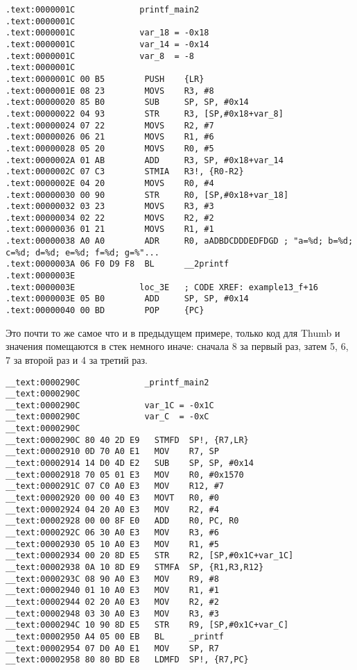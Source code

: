 \begin{lstlisting}[style=customasmARM]
.text:0000001C             printf_main2
.text:0000001C
.text:0000001C             var_18 = -0x18
.text:0000001C             var_14 = -0x14
.text:0000001C             var_8  = -8
.text:0000001C
.text:0000001C 00 B5        PUSH    {LR}
.text:0000001E 08 23        MOVS    R3, #8
.text:00000020 85 B0        SUB     SP, SP, #0x14
.text:00000022 04 93        STR     R3, [SP,#0x18+var_8]
.text:00000024 07 22        MOVS    R2, #7
.text:00000026 06 21        MOVS    R1, #6
.text:00000028 05 20        MOVS    R0, #5
.text:0000002A 01 AB        ADD     R3, SP, #0x18+var_14
.text:0000002C 07 C3        STMIA   R3!, {R0-R2}
.text:0000002E 04 20        MOVS    R0, #4
.text:00000030 00 90        STR     R0, [SP,#0x18+var_18]
.text:00000032 03 23        MOVS    R3, #3
.text:00000034 02 22        MOVS    R2, #2
.text:00000036 01 21        MOVS    R1, #1
.text:00000038 A0 A0        ADR     R0, aADBDCDDDEDFDGD ; "a=%d; b=%d; c=%d; d=%d; e=%d; f=%d; g=%"...
.text:0000003A 06 F0 D9 F8  BL      __2printf
.text:0000003E
.text:0000003E             loc_3E   ; CODE XREF: example13_f+16
.text:0000003E 05 B0        ADD     SP, SP, #0x14
.text:00000040 00 BD        POP     {PC}
\end{lstlisting}

Это почти то же самое что и в предыдущем примере, только код для Thumb и значения помещаются в 
стек немного иначе: сначала 8 за первый раз, затем 5, 6, 7 за второй раз и 4 за третий раз.

\myparagraph{\OptimizingXcodeIV: \ARMMode}

\begin{lstlisting}[style=customasmARM]
__text:0000290C             _printf_main2
__text:0000290C
__text:0000290C             var_1C = -0x1C
__text:0000290C             var_C  = -0xC
__text:0000290C
__text:0000290C 80 40 2D E9   STMFD  SP!, {R7,LR}
__text:00002910 0D 70 A0 E1   MOV    R7, SP
__text:00002914 14 D0 4D E2   SUB    SP, SP, #0x14
__text:00002918 70 05 01 E3   MOV    R0, #0x1570
__text:0000291C 07 C0 A0 E3   MOV    R12, #7
__text:00002920 00 00 40 E3   MOVT   R0, #0
__text:00002924 04 20 A0 E3   MOV    R2, #4
__text:00002928 00 00 8F E0   ADD    R0, PC, R0
__text:0000292C 06 30 A0 E3   MOV    R3, #6
__text:00002930 05 10 A0 E3   MOV    R1, #5
__text:00002934 00 20 8D E5   STR    R2, [SP,#0x1C+var_1C]
__text:00002938 0A 10 8D E9   STMFA  SP, {R1,R3,R12}
__text:0000293C 08 90 A0 E3   MOV    R9, #8
__text:00002940 01 10 A0 E3   MOV    R1, #1
__text:00002944 02 20 A0 E3   MOV    R2, #2
__text:00002948 03 30 A0 E3   MOV    R3, #3
__text:0000294C 10 90 8D E5   STR    R9, [SP,#0x1C+var_C]
__text:00002950 A4 05 00 EB   BL     _printf
__text:00002954 07 D0 A0 E1   MOV    SP, R7
__text:00002958 80 80 BD E8   LDMFD  SP!, {R7,PC}
\end{lstlisting}

